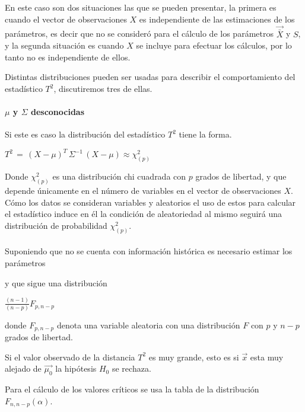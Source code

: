 \documentclass[spanish]{report}
\begin{document}
En este caso son dos situaciones las que se pueden presentar, la primera es cuando el vector de observaciones $X$ es independiente de las estimaciones de los parámetros, es decir que no se consideró para el cálculo de los parámetros $\vec{\bar{X}}$ y $S$, y la segunda situación es cuando $X$ se incluye para efectuar los cálculos, por lo tanto no es independiente de ellos.

Distintas distribuciones pueden ser usadas para describir el comportamiento del estadístico $T^2$, discutiremos tres de ellas.

\paragraph{$\mu$ y $\Sigma$ desconocidas}

Si este es caso la distribución del estadístico  $T^2$ tiene la forma.

$T^2\,=\,(X-\mu)^T\,\Sigma^{-1}\,(X-\mu) \approx \chi_(p)^2$

Donde $\chi_(p)^2$ es una distribución chi cuadrada con $p$ grados de libertad, y que depende únicamente en el número de variables en el vector de observaciones $X$. Cómo los datos se consideran variables y aleatorios el uso de estos para calcular el estadístico induce en él la condición de aleatoriedad al mismo seguirá una distribución de probabilidad $\chi_(p)^2$.

\paragraph{} 

Suponiendo que no se cuenta con información histórica es necesario estimar los parámetros 



y que sigue una distribución

$\frac{(n-1)}{(n-p)}F_{p,n-p}$

donde $F_{p,n-p}$ denota una variable aleatoria con una distribución $F$ con $p$ y $n-p$ grados de libertad.

Si el valor observado de la distancia $T^2$ es muy grande, esto es si $\vec{x}$ esta muy alejado de $\vec{\mu_0}$ la hipótesis $H_0$ se rechaza.

Para el cálculo de los valores críticos se usa la tabla de la distribución $F_{n,n-p}(\alpha)$.
\end{document}
